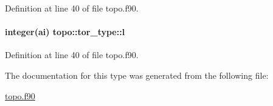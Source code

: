 Definition at line 40 of file topo.\-f90.

\hypertarget{structtopo_1_1tor__type_af5a39599e244741b2ba49b9db0ca46c1}{
\paragraph[{l}]{\setlength{\rightskip}{0pt plus 5cm}integer(ai) topo\-::tor\-\_\-type\-::l}}\label{structtopo_1_1tor__type_af5a39599e244741b2ba49b9db0ca46c1}


Definition at line 40 of file topo.\-f90.



The documentation for this type was generated from the following file\-:\begin{DoxyCompactItemize}
\item 
\hyperlink{topo_8f90}{topo.\-f90}\end{DoxyCompactItemize}
